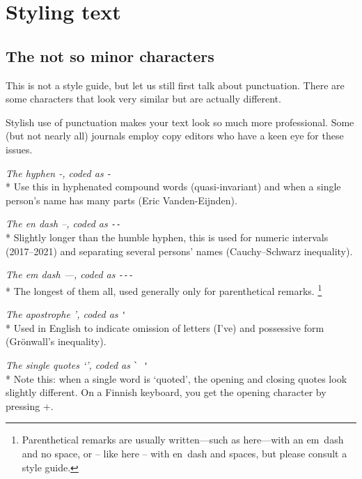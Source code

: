 \chapter{Styling text}

%
%
%
\section{The not so minor characters}

This is not a style guide, but let us still first talk about punctuation.
There are some characters that look very similar but are actually different.

\begin{practices}
Stylish use of punctuation makes your text look so much more professional.
Some (but not nearly all) journals employ copy editors
who have a keen eye for these issues.
\end{practices}

\noindent\emph{The hyphen -, coded as} \verb|-|\\*
Use this in hyphenated compound words (quasi-invariant)
and when a single person's name has many parts (Eric Vanden-Eijnden).

\medskip\noindent\emph{The en dash --, coded as} \verb|--|\\*
Slightly longer than the humble hyphen,
this is used for numeric intervals (2017--2021)
and separating several persons' names (Cauchy--Schwarz inequality).

\medskip\noindent\emph{The em dash ---, coded as} \verb|---|\\*
The longest of them all, used generally only for parenthetical remarks.%
\footnote{Parenthetical remarks are usually written---such as here---with an em~dash and no space,
or -- like here -- with en~dash and spaces,
but please consult a style guide.}

\medskip\noindent\emph{The apostrophe ', coded as} \verb|'|\\*
Used in English to indicate omission of letters (I've)
and possessive form (Grönwall's inequality).

\medskip\noindent\emph{The single quotes `', coded as} \verb|` '|\\*
Note this: when a single word is `quoted',
the opening and closing quotes look slightly different.
On a Finnish keyboard, you get the opening character by pressing
+\fbox{\makebox[1pt]{\raisebox{3pt}{\textasciigrave}}\makebox[0pt]{\raisebox{-3pt}{\textasciiacute}}}.

